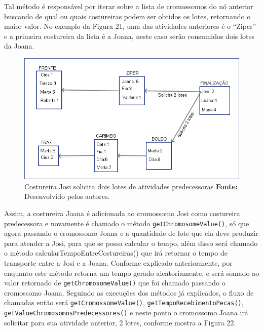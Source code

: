 \par Tal método é responsável por iterar sobre a lista de cromossomos do nó anterior buscando de qual ou quais costureiras 
podem ser obtidos os lotes, retornando o maior valor. No exemplo da Figura 21,
uma das atividades anteriores é o ``Ziper'' e a primeira costureira da lista é a Joana, neste caso serão consumidos dois lotes
da Joana.

\newpage

\begin{figure}[h!]
	\centerline{\includegraphics[scale=0.6]{./imagens/processo_solciitacao_de_lotes1.png}}
	\caption[Distribuição de trabalho]
	{Costureira Josi solicita dois lotes de atividades predecessoras
	\textbf{Fonte:} Desenvolvido pelos autores.}
	\label{fig:exemplo1}
\end{figure}


\par Assim, a costureira Joana é adicionada ao cromossomo Josi como costureira
predecessora e novamente é chamado o método \texttt{getChromosomeValue()}, só que agora passando o cromossomo 
Joana e a quantidade de lote que ela deve produzir para atender a Josi, para que
se possa calcular o tempo, além disso será chamado o método calcularTempoEntreCostureiras() que irá retornar o 
tempo de transporte entre a Josi e a Joana. Conforme explicado anteriormente, 
por enquanto este método retorna um tempo gerado aleatoriamente, e será somado
ao valor retornado de \texttt{getChromosomeValue()} que  foi chamado passando o cromossomo Joana.
Seguindo as execuções dos métodos já explicados, o fluxo de chamadas então será
\texttt{getCromossomeValue()}, \texttt{getTempoRecebimentoPecas()}, \texttt{getValueChromosomosPredecessores()} e 
neste ponto o cromossomo Joana irá solicitar para sua atividade anterior, 2
lotes, conforme mostra a Figura 22.


